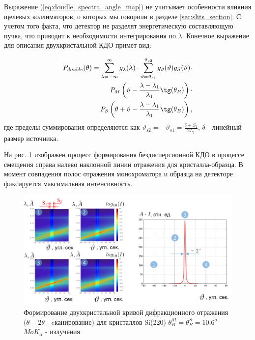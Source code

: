 Выражение (\ref{eq:doudle_spectra_angle_map}) не учитывает особенности влияния
 щелевых коллиматоров, о которых мы говорили в
разделе \ref{sec:slits_section}. С учетом того факта, что детектор не разделят
 энергетическую составляющую пучка, что приводит к необходимости интегрирования по $\lambda$.
Конечное выражение для описания двухкристальной КДО примет вид:

\begin{eqnarray} \label{eq:doudle_spectra_angle_map_on_detector}
  P_{double}(\theta) = \sum_{\lambda = -\infty}^{\infty}g_{\lambda}(\lambda)\cdot
  \sum_{\vartheta = \vartheta_{s1}}^{\vartheta_{s2}} g_{\vartheta}(\vartheta) g_{S}(\vartheta) \cdot \nonumber \\
   P_M \left(\vartheta - \frac{\lambda - \lambda_1}{\lambda_1}\tg(\theta_B) \right) \cdot \nonumber \\
   P_S \left(\theta + \vartheta - \frac{\lambda - \lambda_1}{\lambda_1}\tg(\theta_B)\right),
 \end{eqnarray}
 \noindent
 где пределы суммирования определяются как $\vartheta_{s2} = - \vartheta_{s1} = \frac{\delta+S_1}{2L_1}$,
 $\delta$ - линейный размер источника.

 На рис. \ref{ris:double_crystal_form_kdo} изображен процесс формирования
 бездисперсионной КДО в процессе смещения справа налево наклонной линии отражения
 для кристалла-образца. В момент совпадения полос отражения монохроматора и образца
 на детекторе фиксируется максимальная интенсивность.

 \begin{figure}[H]
   \centering
   \includegraphics[width=1\textwidth]{images/double_crystal_form_kdo.png}
   \caption{Формирование двухкристальной кривой дифракционного отражения
    ($\theta - 2\theta$ - cканирование) для кристаллов Si(220)
   $\theta_B^M = \theta_B^S = 10.6^o$  $MoK_{\alpha}$ - излучения}
   \label{ris:double_crystal_form_kdo}
 \end{figure}

